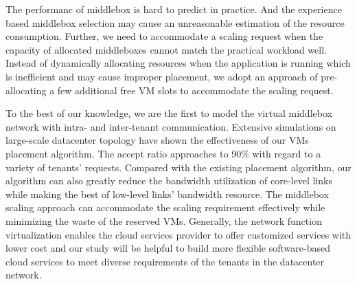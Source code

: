 \documentclass[review]{elsarticle}
\begin{document}
The performanc of middlebox is hard to predict in practice. And the experience based middlebox selection may cause an unreasonable estimation of the resource consumption. 
Further, we need to accommodate a scaling request 
when the capacity of allocated middleboxes cannot match the practical workload well. 
Instead of dynamically allocating resources when the application is running which is inefficient and may cause improper placement,
we adopt an approach of pre-allocating a few additional free VM slots to accommodate the scaling request. 





To the best of our knowledge, we are the first to model the virtual middlebox network with intra- and inter-tenant communication.
Extensive simulations on large-scale datacenter topology have shown the effectiveness of our VMs placement
algorithm.
 The accept ratio approaches to 90\% with regard to a variety of tenants' requests.
 Compared with the existing placement algorithm, our algorithm can also greatly reduce the bandwidth utilization of core-level links while making the best of low-level links' bandwidth resource. The middlebox scaling approach can accommodate the scaling requirement effectively while minimizing the waste of the reserved VMs. %
Generally, the network function virtualization enables the cloud services provider to offer customized services with lower cost and our study will be helpful to build more flexible software-based cloud services to meet diverse requirements of  the tenants in the datacenter network.
\end{document}

